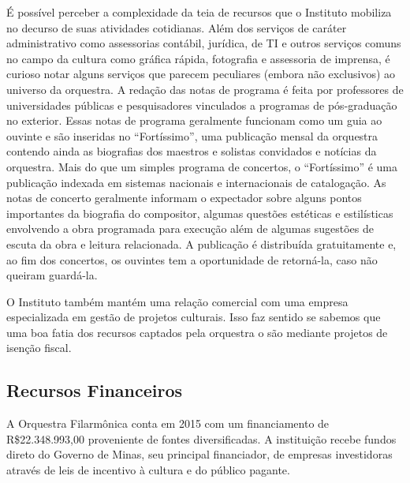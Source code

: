 \documentclass[a4paper, 12pt, openright, oneside, german, french, english, brazil]{abntex2}
\begin{document}
	É possível perceber a complexidade da teia de recursos que o Instituto mobiliza no decurso de suas atividades cotidianas. Além dos serviços de caráter administrativo como assessorias contábil, jurídica, de TI e outros serviços comuns no campo da cultura como gráfica rápida, fotografia e assessoria de imprensa, é curioso notar alguns serviços que parecem peculiares (embora não exclusivos) ao universo da orquestra. A redação das notas de programa é feita por professores de universidades públicas e pesquisadores vinculados a programas de pós-graduação no exterior. Essas notas de programa geralmente funcionam como um guia ao ouvinte e são inseridas no ``Fortíssimo'', uma publicação mensal da orquestra contendo ainda as biografias dos maestros e solistas convidados e notícias da orquestra. Mais do que um simples programa de concertos, o ``Fortíssimo'' é uma publicação indexada em sistemas nacionais e internacionais de catalogação. As notas de concerto geralmente informam o expectador sobre alguns pontos importantes da biografia do compositor, algumas questões estéticas e estilísticas envolvendo a obra programada para execução além de algumas sugestões de escuta da obra e leitura relacionada. A publicação é distribuída gratuitamente e, ao fim dos concertos, os ouvintes tem a oportunidade de retorná-la, caso não queiram guardá-la.



	O Instituto também mantém uma relação comercial com uma empresa especializada em gestão de projetos culturais. Isso faz sentido se sabemos que uma boa fatia dos recursos captados pela orquestra o são mediante projetos de isenção fiscal.



	\subsection{Recursos Financeiros}



	A Orquestra Filarmônica conta em 2015 com um financiamento de R\$22.348.993,00 proveniente de fontes diversificadas. A instituição recebe fundos direto do Governo de Minas, seu principal financiador, de empresas investidoras através de leis de incentivo à cultura e do público pagante.




\end{document}
